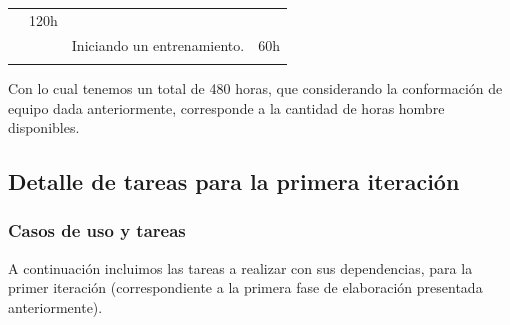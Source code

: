 \begin{longtable}[c]{@{}llll@{}}
\begin{minipage}[t]{0.58\columnwidth}
\end{minipage} & \begin{minipage}[t]{0.12\columnwidth}\raggedright
120h
\end{minipage}
\\\noalign{\medskip}
\begin{minipage}[t]{0.17\columnwidth}\raggedright
\end{minipage} & \begin{minipage}[t]{0.12\columnwidth}\raggedright
\end{minipage} & \begin{minipage}[t]{0.58\columnwidth}\raggedright
Iniciando un entrenamiento.
\end{minipage} & \begin{minipage}[t]{0.12\columnwidth}\raggedright
60h
\end{minipage}
\\\noalign{\medskip}
\hline
\end{longtable}

Con lo cual tenemos un total de 480 horas, que considerando la
conformación de equipo dada anteriormente, corresponde a la cantidad de
horas hombre disponibles.

\subsection{Detalle de tareas para la primera iteración}

\subsubsection{Casos de uso y tareas}

A continuación incluimos las tareas a realizar con sus dependencias,
para la primer iteración (correspondiente a la primera fase de
elaboración presentada anteriormente).

